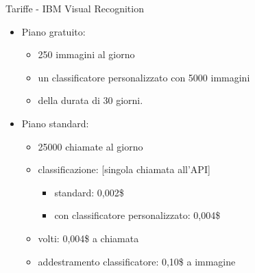%
\begin{frame}[t]{Tariffe - IBM Visual Recognition}
\begin{itemize}
	\item Piano gratuito:
	\begin{itemize}
		\item 250 immagini al giorno
		\item un classificatore personalizzato con 5000 immagini
		\item della durata di 30 giorni.
	\end{itemize}
	\item Piano standard:
	\begin{itemize}
		\item 25000 chiamate al giorno
		\item classificazione: [singola chiamata all'API]
		\begin{itemize}
			\item standard: 0,002\$
			\item con classificatore personalizzato: 0,004\$
		\end{itemize}
		\item volti: 0,004\$ a chiamata
		\item addestramento classificatore: 0,10\$ a immagine
	\end{itemize}
\end{itemize}
\end{frame}
%
